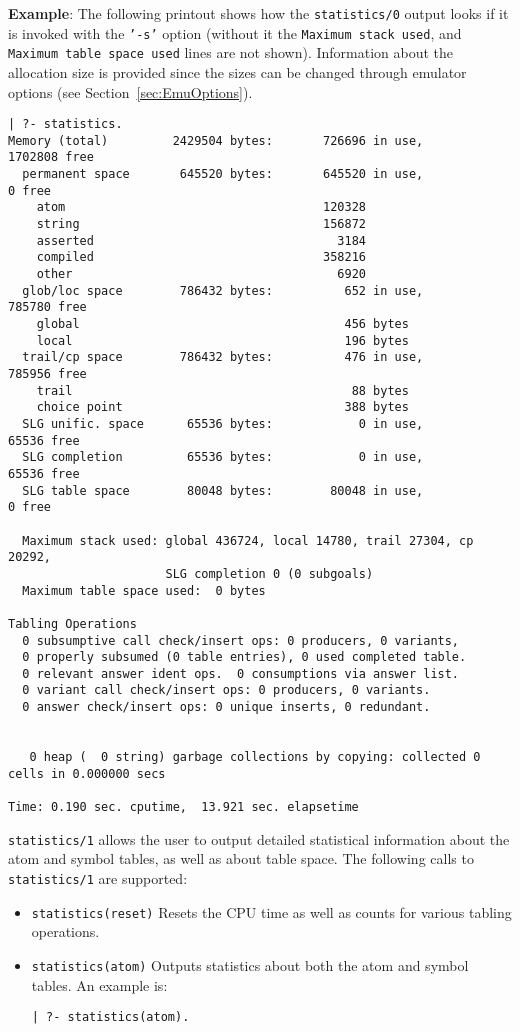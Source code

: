 \begin{description}
{\bf Example}: The following printout shows how the {\tt statistics/0}
output looks if it is invoked with the {\tt '-s'} option (without it
the {\tt Maximum stack used}, and {\tt Maximum table space used} lines
are not shown).  Information about the allocation size is provided
since the sizes can be changed through emulator options (see
Section~\ref{sec:EmuOptions}).

    {\footnotesize
     \begin{verbatim}
| ?- statistics.
Memory (total)         2429504 bytes:       726696 in use,      1702808 free
  permanent space       645520 bytes:       645520 in use,            0 free
    atom                                    120328
    string                                  156872
    asserted                                  3184
    compiled                                358216
    other                                     6920
  glob/loc space        786432 bytes:          652 in use,       785780 free
    global                                     456 bytes
    local                                      196 bytes
  trail/cp space        786432 bytes:          476 in use,       785956 free
    trail                                       88 bytes
    choice point                               388 bytes
  SLG unific. space      65536 bytes:            0 in use,        65536 free
  SLG completion         65536 bytes:            0 in use,        65536 free
  SLG table space        80048 bytes:        80048 in use,            0 free

  Maximum stack used: global 436724, local 14780, trail 27304, cp 20292,
                      SLG completion 0 (0 subgoals)
  Maximum table space used:  0 bytes

Tabling Operations
  0 subsumptive call check/insert ops: 0 producers, 0 variants,
  0 properly subsumed (0 table entries), 0 used completed table.
  0 relevant answer ident ops.  0 consumptions via answer list.
  0 variant call check/insert ops: 0 producers, 0 variants.
  0 answer check/insert ops: 0 unique inserts, 0 redundant.


   0 heap (  0 string) garbage collections by copying: collected 0 cells in 0.000000 secs

Time: 0.190 sec. cputime,  13.921 sec. elapsetime
\end{verbatim}} 


%
{\tt statistics/1} allows the user to output detailed statistical
information about the atom and symbol tables, as well as about table
space.  The following calls to {\tt statistics/1} are supported:
%
\begin{itemize}
\item {\tt statistics(reset)}  Resets the CPU time as well as counts
for various tabling operations. 
%
\item {\tt statistics(atom)} Outputs statistics about both the atom
and symbol tables.  An example is: 
%
{\footnotesize
\begin{verbatim}
| ?- statistics(atom).


\end{verbatim}}
\end{itemize}
\end{description}
